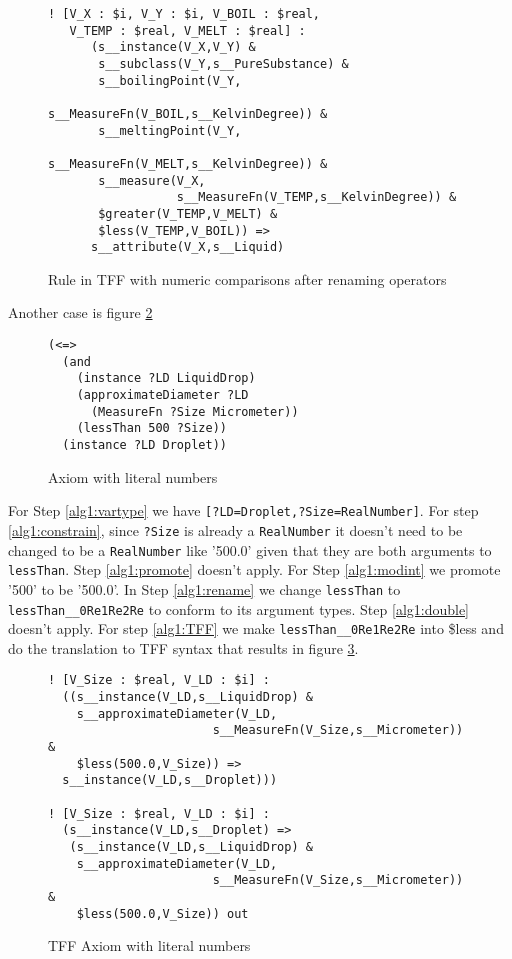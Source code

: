 \documentclass{article}
\begin{document}
\begin{figure}[H]
\begin{framed}
\begin{verbatim}
! [V_X : $i, V_Y : $i, V_BOIL : $real, 
   V_TEMP : $real, V_MELT : $real] :
      (s__instance(V_X,V_Y) &
       s__subclass(V_Y,s__PureSubstance) &
       s__boilingPoint(V_Y,
                       s__MeasureFn(V_BOIL,s__KelvinDegree)) &
       s__meltingPoint(V_Y,
                       s__MeasureFn(V_MELT,s__KelvinDegree)) &
       s__measure(V_X,
                  s__MeasureFn(V_TEMP,s__KelvinDegree)) &
       $greater(V_TEMP,V_MELT) &
       $less(V_TEMP,V_BOIL)) =>
      s__attribute(V_X,s__Liquid)
\end{verbatim}
\end{framed}
\caption{Rule in TFF with numeric comparisons after renaming operators}
\label{fig:TFFRenameReal}
\end{figure}

Another case is figure \ref{fig:LiquidDrop}

\begin{figure}[H]
\begin{framed}
\begin{verbatim}
(<=>
  (and
    (instance ?LD LiquidDrop)
    (approximateDiameter ?LD
      (MeasureFn ?Size Micrometer))
    (lessThan 500 ?Size))
  (instance ?LD Droplet))
\end{verbatim}
\end{framed}
\caption{Axiom with literal numbers}
\label{fig:LiquidDrop}
\end{figure}

For Step \ref{alg1:vartype} we have \texttt{[?LD=Droplet,?Size=RealNumber]}. For
step \ref{alg1:constrain}, since \texttt{?Size} is already a \texttt{RealNumber}
it doesn't need to be changed to be a \texttt{RealNumber} like '500.0' given
that they are both arguments to \texttt{lessThan}.  Step \ref{alg1:promote}
doesn't apply. For Step \ref{alg1:modint} we promote '500' to be '500.0'. In
Step \ref{alg1:rename} we change \texttt{lessThan} to \texttt{lessThan\_\_0Re1Re2Re} to
conform to its argument types.   Step \ref{alg1:double} doesn't apply.
For step \ref{alg1:TFF} we make \texttt{lessThan\_\_0Re1Re2Re} into \$less and do the
translation to TFF syntax that results in figure \ref{fig:TFFLiquidDrop}.

\begin{figure}[H]
\begin{framed}
\begin{verbatim}
! [V_Size : $real, V_LD : $i] :
  ((s__instance(V_LD,s__LiquidDrop) & 
    s__approximateDiameter(V_LD,
                       s__MeasureFn(V_Size,s__Micrometer)) &
    $less(500.0,V_Size)) =>
  s__instance(V_LD,s__Droplet)))

! [V_Size : $real, V_LD : $i] :
  (s__instance(V_LD,s__Droplet) =>
   (s__instance(V_LD,s__LiquidDrop) & 
    s__approximateDiameter(V_LD,
                       s__MeasureFn(V_Size,s__Micrometer)) &
    $less(500.0,V_Size)) out
\end{verbatim}
\end{framed}
\caption{TFF Axiom with literal numbers}
\label{fig:TFFLiquidDrop}
\end{figure}
\end{document}
